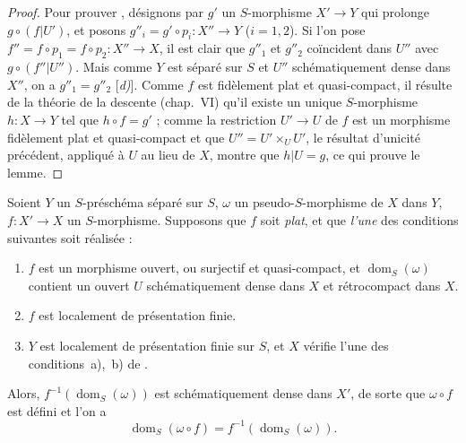 \begin{proof}
Pour prouver , désignons par $g'$ un $S$-morphisme $X'\to Y$ qui prolonge $g\circ(f|U')$, et posons $g''_i=g'\circ p_i:X''\to Y$ ($i=1,2$).
Si l'on pose $f''=f\circ p_1=f\circ p_2:X''\to X$, il est clair que $g''_1$ et $g''_2$ coïncident dans $U''$ avec $g\circ(f''|U'')$.
Mais comme $Y$ est séparé sur $S$ et $U''$ schématiquement dense dans $X''$, on a $g''_1=g''_2$ [\emph{d)}].
Comme $f$ est fidèlement plat et quasi-compact, il résulte de la théorie de la descente (chap.~VI) qu'il existe un unique $S$-morphisme $h:X\to Y$ tel que $h\circ f=g'$ ; comme la restriction $U'\to U$ de $f$ est un morphisme fidèlement plat et quasi-compact et que $U''=U'\times_U U'$, le résultat d'unicité précédent, appliqué à $U$ au lieu de $X$, montre que $h|U=g$, ce qui prouve le lemme.
\end{proof}

\begin{proposition}[20.3.11]
\label{IV.20.3.11}
Soient $Y$ un $S$-préschéma séparé sur $S$, $\omega$ un pseudo-$S$-morphisme de $X$ dans $Y$, $f:X'\to X$ un $S$-morphisme.
Supposons que $f$ soit \emph{plat}, et que \emph{l'une} des conditions suivantes soit réalisée :
\begin{enumerate}[label=\emph{(\roman*)}]
  \item $f$ est un morphisme ouvert, ou surjectif et quasi-compact, et $\operatorname{dom}_S(\omega)$ contient un ouvert $U$ schématiquement dense dans $X$ et rétrocompact dans $X$.
  \item $f$ est localement de présentation finie.
  \item $Y$ est localement de présentation finie sur $S$, et $X$ vérifie l'une des conditions~\textup{a)},~\textup{b)} de .
\end{enumerate}

Alors, $f^{-1}(\operatorname{dom}_S(\omega))$ est schématiquement dense dans $X'$, de sorte que $\omega\circ f$ est défini  et l'on a
\[
\label{IV.20.3.11.1}
  \operatorname{dom}_S(\omega\circ f)=f^{-1}(\operatorname{dom}_S(\omega)).
  \tag{20.3.11.1}
\]
\end{proposition}

